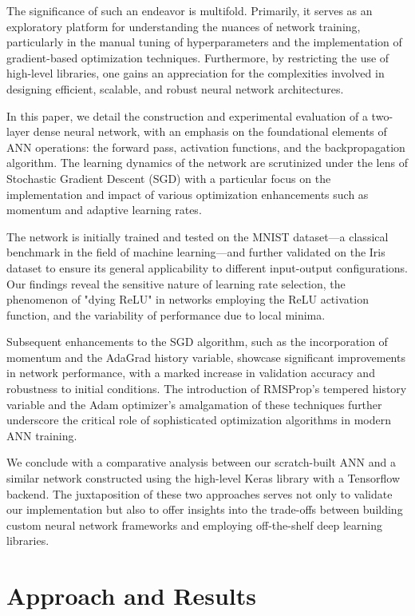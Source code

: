 \documentclass[letterpaper]{article}
\begin{document}
The significance of such an endeavor is multifold. Primarily, it serves as an exploratory platform for understanding the nuances of network training, particularly in the manual tuning of hyperparameters and the implementation of gradient-based optimization techniques. Furthermore, by restricting the use of high-level libraries, one gains an appreciation for the complexities involved in designing efficient, scalable, and robust neural network architectures.

In this paper, we detail the construction and experimental evaluation of a two-layer dense neural network, with an emphasis on the foundational elements of ANN operations: the forward pass, activation functions, and the backpropagation algorithm. The learning dynamics of the network are scrutinized under the lens of Stochastic Gradient Descent (SGD) with a particular focus on the implementation and impact of various optimization enhancements such as momentum and adaptive learning rates.

The network is initially trained and tested on the MNIST dataset—a classical benchmark in the field of machine learning—and further validated on the Iris dataset to ensure its general applicability to different input-output configurations. Our findings reveal the sensitive nature of learning rate selection, the phenomenon of "dying ReLU" in networks employing the ReLU activation function, and the variability of performance due to local minima.

Subsequent enhancements to the SGD algorithm, such as the incorporation of momentum and the AdaGrad history variable, showcase significant improvements in network performance, with a marked increase in validation accuracy and robustness to initial conditions. The introduction of RMSProp's tempered history variable and the Adam optimizer's amalgamation of these techniques further underscore the critical role of sophisticated optimization algorithms in modern ANN training.

We conclude with a comparative analysis between our scratch-built ANN and a similar network constructed using the high-level Keras library with a Tensorflow backend. The juxtaposition of these two approaches serves not only to validate our implementation but also to offer insights into the trade-offs between building custom neural network frameworks and employing off-the-shelf deep learning libraries.

\section{Approach and Results}
\end{document}

